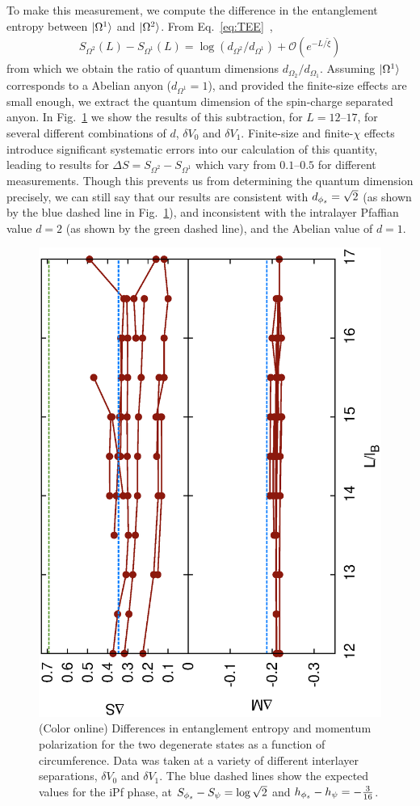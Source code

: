 To make this measurement, we compute the difference in the entanglement entropy between $\ket{\Omega^1}$ and $\ket{\Omega^2}$.
From Eq.~\eqref{eq:TEE}~\cite{KitaevPreskill,LevinWen},
\begin{align}
	S_{\Omega^2}(L) - S_{\Omega^1}(L) = \log(d_{\Omega^2}/d_{\Omega^1}) + \mathcal{O}(e^{-L/\tilde{\xi}})
\end{align}
from which we obtain the ratio of quantum dimensions $d_{\Omega_2}/d_{\Omega_1}$.
Assuming $\ket{\Omega^1}$ corresponds to a Abelian anyon ($d_{\Omega^1}=1$), and provided the finite-size effects are small enough, we extract the quantum dimension of the spin-charge separated anyon.
In Fig.~\ref{deltas} we show the results of this subtraction, for $L = 12\mbox{--}17$, for several different combinations of $d$, $\delta V_0$ and $\delta V_1$.
Finite-size and finite-$\chi$ effects introduce significant systematic errors into our calculation of this quantity, leading to results for $\Delta S = S_{\Omega^2} - S_{\Omega^1}$ which vary from $0.1\mbox{--}0.5$ for different measurements.
Though this prevents us from determining the quantum dimension precisely, we can still say that our results are consistent with $d_{{\phi_s}} = \sqrt{2}$ (as shown by the blue dashed line in Fig.~\ref{deltas}), and inconsistent with the intralayer Pfaffian value $d=2$ (as shown by the green dashed line), and the Abelian value of $d=1$. 

\begin{figure}%
	\includegraphics[angle=-90,width=0.6\linewidth]{figures/deltas.eps}
	\caption{(Color online)
		Differences in entanglement entropy and momentum polarization for the two degenerate states as a function of circumference.
		Data was taken at a variety of different interlayer separations, $\delta V_0$ and $\delta V_1$.
		The blue dashed lines show the expected values for the iPf phase, at $S_{\phi_s} - S_\psi = \log\sqrt{2}$ and $h_{\phi_s}-h_\psi = -\frac{3}{16}$.
	}
	\label{deltas}
\end{figure}


